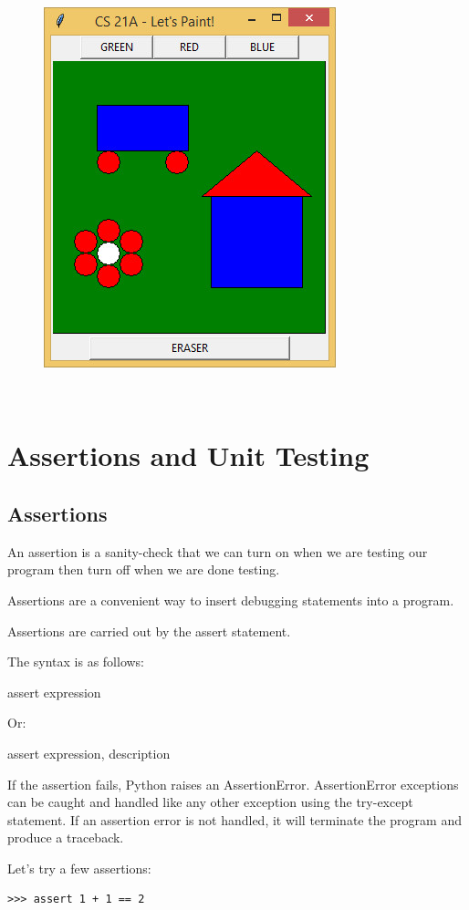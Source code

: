 \documentclass{article}
\begin{document}
\begin{figure}[h]
\includegraphics[scale=.6]{paint2}
\end{figure}\

\section{Assertions and Unit Testing}
\subsection{Assertions}
An assertion is a sanity-check that we can turn on when we are testing our program then turn  off when we are done testing.

Assertions are a convenient way to insert debugging statements into a program.

Assertions are carried out by the assert statement.

The syntax is as follows:

assert expression

Or:

assert expression,  description

If the assertion fails, Python raises an AssertionError.   AssertionError exceptions can be caught and handled like any other exception using the try-except statement.  If an assertion error is  not handled, it will terminate the program and produce a traceback.

Let's try a few assertions:

\begin{lstlisting}
>>> assert 1 + 1 == 2
\end{lstlisting}
\end{document}
